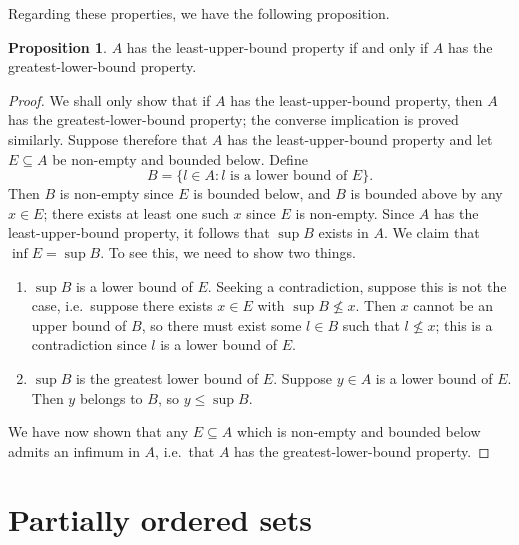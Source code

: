 \documentclass[12pt]{article}
\theoremstyle{definition}
\newtheorem{proposition}[definition]{Proposition}
\begin{document}
Regarding these properties, we have the following proposition.

\begin{proposition}
\label{prop:lub_glb_property_equivalence}
    \( A \) has the least-upper-bound property if and only if \( A \) has the greatest-lower-bound property.
\end{proposition}

\begin{proof}
    We shall only show that if \( A \) has the least-upper-bound property, then \( A \) has the greatest-lower-bound property; the converse implication is proved similarly. Suppose therefore that \( A \) has the least-upper-bound property and let \( E \subseteq A \) be non-empty and bounded below. Define
    \[
        B = \{ l \in A : l \text{ is a lower bound of } E \}.
    \]
    Then \( B \) is non-empty since \( E \) is bounded below, and \( B \) is bounded above by any \( x \in E \); there exists at least one such \( x \) since \( E \) is non-empty. Since \( A \) has the least-upper-bound property, it follows that \( \sup B \) exists in \( A \). We claim that \( \inf E = \sup B \). To see this, we need to show two things.
    
    \begin{enumerate}[label = (\roman*)]
        \item \( \sup B \) is a lower bound of \( E \). Seeking a contradiction, suppose this is not the case, i.e.\ suppose there exists \( x \in E \) with \( \sup B \not\leq x \). Then \( x \) cannot be an upper bound of \( B \), so there must exist some \( l \in B \) such that \( l \not\leq x \); this is a contradiction since \( l \) is a lower bound of \( E \).

        \item \( \sup B \) is the greatest lower bound of \( E \). Suppose \( y \in A \) is a lower bound of \( E \). Then \( y \) belongs to \( B \), so \( y \leq \sup B \).
    \end{enumerate}

    We have now shown that any \( E \subseteq A \) which is non-empty and bounded below admits an infimum in \( A \), i.e.\ that \( A \) has the greatest-lower-bound property.
\end{proof}

\section{Partially ordered sets}
\label{sec:partially_ordered_sets}
\end{document}
